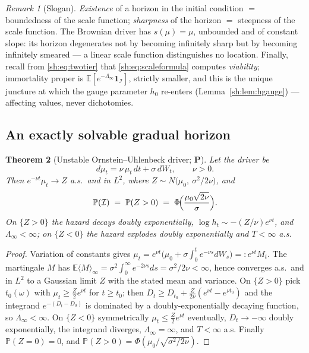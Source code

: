 \documentclass[11pt]{article}
\numberwithin{equation}{section}
\theoremstyle{plain}
\newtheorem{theorem}{Theorem}[section]
\theoremstyle{definition}
\theoremstyle{remark}
\newtheorem{remark}[theorem]{Remark}
\newcommand{\E}{\mathbb{E}}
\newcommand{\PP}{\mathbb{P}}
\newcommand{\one}{\mathbf{1}}
\newcommand{\Imm}{\mathcal{I}}
\begin{document}
\begin{remark}[Slogan]\label{sh:rem:slogan}
\emph{Existence} of a horizon in the initial condition
$=$ boundedness of the scale function;
\emph{sharpness} of the horizon $=$ steepness of the scale function.
The Brownian driver has $s(\mu)=\mu$, unbounded and of constant slope: its
horizon degenerates not by becoming infinitely sharp but by becoming
infinitely smeared --- a linear scale function distinguishes no location.
Finally, recall from \eqref{sh:eq:twotier} that
\eqref{sh:eq:scaleformula} computes \emph{viability}; immortality proper is
$\E[e^{-\Lambda_\infty}\one_\Imm]$, strictly smaller, and this is the
unique juncture at which the gauge parameter $h_0$ re-enters
(Lemma~\ref{sh:lem:hgauge}) --- affecting values, never dichotomies.
\end{remark}

\subsection{An exactly solvable gradual horizon}\label{sh:subsub:solvable}

\begin{theorem}[Unstable Ornstein--Uhlenbeck driver; \textbf{P}]
\label{sh:thm:uou}
Let the driver be
\begin{equation}\label{sh:eq:uou}
d\mu_t=\nu\,\mu_t\,dt+\sigma\,dW_t,\qquad \nu>0 .
\end{equation}
Then $e^{-\nu t}\mu_t\to Z$ a.s.\ and in $L^2$, where
$Z\sim N\!\bigl(\mu_0,\ \sigma^2/2\nu\bigr)$, and
\begin{equation}\label{sh:eq:sigmoid}
\PP(\Imm)\;=\;\PP(Z>0)\;=\;\Phi\!\Bigl(\frac{\mu_0\sqrt{2\nu}}{\sigma}\Bigr).
\end{equation}
On $\{Z>0\}$ the hazard decays doubly exponentially,
$\log h_t\sim-(Z/\nu)e^{\nu t}$, and $\Lambda_\infty<\infty$; on
$\{Z<0\}$ the hazard explodes doubly exponentially and $T<\infty$ a.s.
\end{theorem}

\begin{proof}
Variation of constants gives
$\mu_t=e^{\nu t}\bigl(\mu_0+\sigma\int_0^te^{-\nu s}dW_s\bigr)
=:e^{\nu t}M_t$. The martingale $M$ has
$\E\langle M\rangle_\infty=\sigma^2\!\int_0^\infty e^{-2\nu s}ds
=\sigma^2/2\nu<\infty$, hence converges a.s.\ and in $L^2$ to a Gaussian
limit $Z$ with the stated mean and variance. On $\{Z>0\}$ pick
$t_0(\omega)$ with $\mu_t\ge\tfrac Z2e^{\nu t}$ for $t\ge t_0$; then
$D_t\ge D_{t_0}+\tfrac{Z}{2\nu}(e^{\nu t}-e^{\nu t_0})$ and the integrand
$e^{-(D_t-D_0)}$ is dominated by a doubly-exponentially decaying function,
so $\Lambda_\infty<\infty$. On $\{Z<0\}$ symmetrically
$\mu_t\le\tfrac Z2e^{\nu t}$ eventually, $D_t\to-\infty$ doubly
exponentially, the integrand diverges, $\Lambda_\infty=\infty$, and
$T<\infty$ a.s. Finally $\PP(Z=0)=0$, and
$\PP(Z>0)=\Phi(\mu_0/\sqrt{\sigma^2/2\nu})$.
\end{proof}
\end{document}
